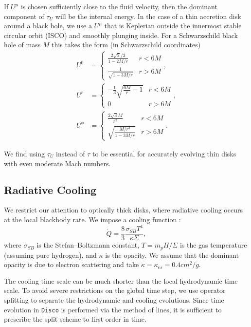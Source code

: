 \documentclass{emulateapj}
\newcommand{\sig}{\sigma}
\newcommand{\Sig}{\Sigma}
\newcommand{\ka}{\kappa}
\newcommand{\Disco}{{\texttt{Disco}}}
\begin{document}
If $U^\mu$ is chosen sufficiently close to the fluid velocity, then the dominant component of $\tau_U$ will be the internal energy.  In the case of a thin accretion disk around a black hole, we use a $U^\mu$ that is Keplerian outside the innermost stable circular orbit (ISCO) and smoothly plunging inside.  For a Schwarzschild black hole of mass $M$ this takes the form (in Schwarzschild coordinates)
\begin{align}
	U^0 &= \left \{ \begin{matrix} \frac{2\sqrt{2}/3}{1-2M/r} & r < 6M \\
						\frac{1}{\sqrt{1-3M/r}} & r > 6M \end{matrix} \right . , \nonumber \\
	U^r &= \left \{ \begin{matrix} -\frac{1}{3}\sqrt{\frac{6M}{r}-1} & r < 6M \\
						0 & r > 6M \end{matrix} \right . , \nonumber \\
	U^\phi &= \left \{ \begin{matrix}  \frac{2 \sqrt{3} M}{r^2} & r < 6M \\
						\sqrt{\frac{M/r^3}{1-3M/r}} & r > 6M \end{matrix} \right . . \label{eq:Ugeo}
\end{align}


We find using $\tau_U$ instead of $\tau$ to be essential for accurately evolving thin disks with even moderate Mach numbers.

\subsection{Radiative Cooling}
\label{subsec:cooling}

We restrict our attention to optically thick disks, where radiative cooling occurs at the local blackbody rate. We impose a cooling function \citep{Novikov73, FrankKingRaine}:
\begin{equation}
	\dot{Q} = \frac{8}{3} \frac{\sig_{SB} T^4}{\ka \Sig} , \label{eq:BBcooling}
\end{equation}
where $\sig_{SB}$ is the Stefan--Boltzmann constant, $T = m_p \Pi / \Sig$ is the gas temperature (assuming pure hydrogen), and $\ka $ is the opacity.  We assume that the dominant opacity is due to electron scattering and take $\ka = \ka_{es} = 0.4 cm^2/g$.

The cooling time scale can be much shorter than the local hydrodynamic time scale.  To avoid severe restrictions on the global time step, we use operator splitting to separate the hydrodynamic and cooling evolutions.  Since time evolution in \Disco{} is performed via the method of lines, it is sufficient to prescribe the split scheme to first order in time.
\end{document}
